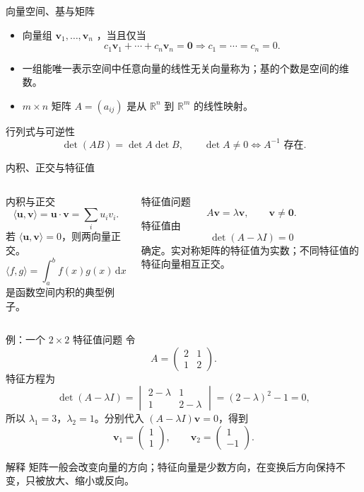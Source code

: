 \begin{frame}{向量空间、基与矩阵}
  \begin{itemize}
    \item 向量组 $\mathbf{v}_1,\ldots,\mathbf{v}_n$ ，当且仅当
    \[
      c_1\mathbf{v}_1+\cdots+c_n\mathbf{v}_n=\mathbf{0}
      \Rightarrow c_1=\cdots=c_n=0.
    \]
    \item 一组能唯一表示空间中任意向量的线性无关向量称为；基的个数是空间的维数。
    \item $m\times n$ 矩阵 $A=(a_{ij})$ 是从 $\mathbb{R}^n$ 到 $\mathbb{R}^m$ 的线性映射。
  \end{itemize}
  \begin{block}{行列式与可逆性}
    \[
      \det(AB)=\det A\det B,
      \qquad
      \det A\ne0\Longleftrightarrow A^{-1}\text{ 存在}.
    \]
  \end{block}
\end{frame}

\begin{frame}{内积、正交与特征值}
  \begin{columns}[T]
    \begin{block}{内积与正交}
      \[
        \langle\mathbf{u},\mathbf{v}\rangle
        =\mathbf{u}\cdot\mathbf{v}=\sum_i u_iv_i.
      \]
      若 $\langle\mathbf{u},\mathbf{v}\rangle=0$，则两向量正交。
      \[
        \langle f,g\rangle=\int_a^b f(x)g(x)\,\mathrm{d}x
      \]
      是函数空间内积的典型例子。
    \end{block}
    \begin{block}{特征值问题}
      \[
        A\mathbf{v}=\lambda\mathbf{v},
        \qquad \mathbf{v}\ne\mathbf{0}.
      \]
      特征值由
      \[
        \det(A-\lambda I)=0
      \]
      确定。实对称矩阵的特征值为实数；不同特征值的特征向量相互正交。
    \end{block}
  \end{columns}
\end{frame}

\begin{frame}{例：一个 $2\times2$ 特征值问题}
  \small
  令
  \[
    A=\begin{pmatrix}2&1\\1&2\end{pmatrix}.
  \]
  特征方程为
  \[
    \det(A-\lambda I)
    =\begin{vmatrix}2-\lambda&1\\1&2-\lambda\end{vmatrix}
    =(2-\lambda)^2-1=0,
  \]
  所以 $\lambda_1=3$，$\lambda_2=1$。分别代入 $(A-\lambda I)\mathbf{v}=0$，得到
  \[
    \mathbf{v}_1=\begin{pmatrix}1\\1\end{pmatrix},
    \qquad
    \mathbf{v}_2=\begin{pmatrix}1\\-1\end{pmatrix}.
  \]
  \begin{block}{解释}
    矩阵一般会改变向量的方向；特征向量是少数方向，在变换后方向保持不变，只被放大、缩小或反向。
  \end{block}
\end{frame}

